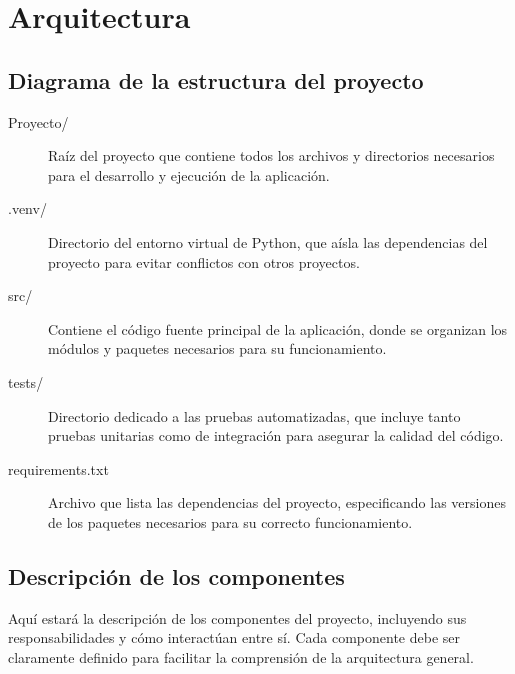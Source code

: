 \section{Arquitectura}

\subsection{Diagrama de la estructura del proyecto}
	\begin{description}
		\item[Proyecto/]  
		Raíz del proyecto que contiene todos los archivos y directorios necesarios para el desarrollo y ejecución de la aplicación.
		\item[.venv/]  
		Directorio del entorno virtual de Python, que aísla las dependencias del proyecto para evitar conflictos con otros proyectos.
		\item[src/]  
		Contiene el código fuente principal de la aplicación, donde se organizan los módulos y paquetes necesarios para su funcionamiento.
		\item[tests/]  
		Directorio dedicado a las pruebas automatizadas, que incluye tanto pruebas unitarias como de integración para asegurar la calidad del código.
		\item[requirements.txt]  
		Archivo que lista las dependencias del proyecto, especificando las versiones de los paquetes necesarios para su correcto funcionamiento.
	\end{description}

\subsection{Descripci\'on de los componentes}

\noindent Aquí estará la descripción de los componentes del proyecto, incluyendo sus responsabilidades y cómo interactúan entre sí. Cada componente debe ser claramente definido para facilitar la comprensión de la arquitectura general.



